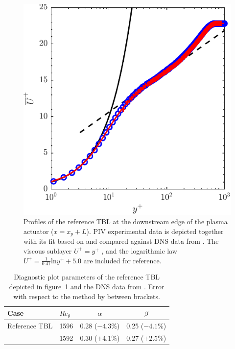 \begin{figure}
    \centering
    \includegraphics[width = 0.7\linewidth]{figures/methodology/TBLref.pdf}
    \caption{Profiles of the reference TBL at the downstream edge of the plasma actuator ($x=x_p+L$). PIV experimental data  is depicted together with its fit based on \citet{chauhan2009}  and compared against DNS data from \citet{jimenez2010} . The viscous sublayer $U^+ = y^+$ , and the logarithmic law $U^+=\frac{1}{0.41} \mathrm{ln}y^+ + 5.0$  are included for reference.}
    \label{fig:TBLref}
\end{figure}
\begin{table}
\centering
\begin{tabular}{llcc}
\toprule
Case & $Re_\theta$ & $\alpha$ & $\beta$ \\ \midrule
Reference TBL & 1596 & 0.28 ($-4.3\%$) & 0.25 ($-4.1\%$) \\
\citet{jimenez2010} & 1592 & 0.30 ($+4.1\%$) & 0.27 ($+2.5\%$) \\
\bottomrule
\end{tabular}
\caption{Diagnostic plot parameters of the reference TBL depicted in figure~\ref{fig:TBLref} and the DNS data from \citet{jimenez2010}. Error with respect to the method by \citet{sanmiguel2017diagnostic} between brackets.}\label{tab:diagnostic}
\end{table}

